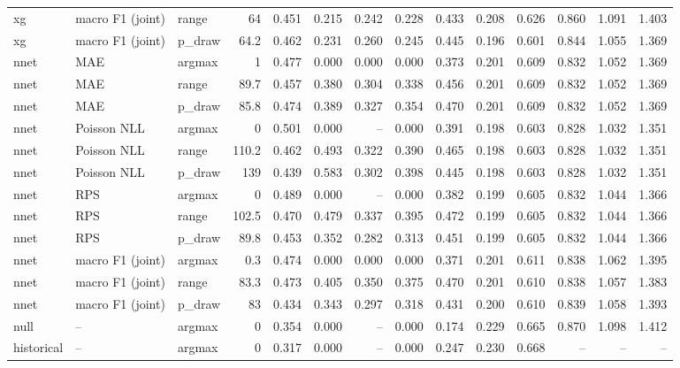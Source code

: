 \begin{tabular}{lllrrrrrrrrrrr}
xg & macro F1 (joint) & range & 64 & 0.451 & 0.215 & 0.242 & 0.228 & 0.433 & 0.208 & 0.626 & 0.860 & 1.091 & 1.403\\
xg & macro F1 (joint) & p\_draw & 64.2 & 0.462 & 0.231 & 0.260 & 0.245 & 0.445 & 0.196 & 0.601 & 0.844 & 1.055 & 1.369\\
nnet & MAE & argmax & 1 & 0.477 & 0.000 & 0.000 & 0.000 & 0.373 & 0.201 & 0.609 & 0.832 & 1.052 & 1.369\\
nnet & MAE & range & 89.7 & 0.457 & 0.380 & 0.304 & 0.338 & 0.456 & 0.201 & 0.609 & 0.832 & 1.052 & 1.369\\
nnet & MAE & p\_draw & 85.8 & 0.474 & 0.389 & 0.327 & 0.354 & 0.470 & 0.201 & 0.609 & 0.832 & 1.052 & 1.369\\
nnet & Poisson NLL & argmax & 0 & 0.501 & 0.000 & -- & 0.000 & 0.391 & 0.198 & 0.603 & 0.828 & 1.032 & 1.351\\
nnet & Poisson NLL & range & 110.2 & 0.462 & 0.493 & 0.322 & 0.390 & 0.465 & 0.198 & 0.603 & 0.828 & 1.032 & 1.351\\
nnet & Poisson NLL & p\_draw & 139 & 0.439 & 0.583 & 0.302 & 0.398 & 0.445 & 0.198 & 0.603 & 0.828 & 1.032 & 1.351\\
nnet & RPS & argmax & 0 & 0.489 & 0.000 & -- & 0.000 & 0.382 & 0.199 & 0.605 & 0.832 & 1.044 & 1.366\\
nnet & RPS & range & 102.5 & 0.470 & 0.479 & 0.337 & 0.395 & 0.472 & 0.199 & 0.605 & 0.832 & 1.044 & 1.366\\
nnet & RPS & p\_draw & 89.8 & 0.453 & 0.352 & 0.282 & 0.313 & 0.451 & 0.199 & 0.605 & 0.832 & 1.044 & 1.366\\
nnet & macro F1 (joint) & argmax & 0.3 & 0.474 & 0.000 & 0.000 & 0.000 & 0.371 & 0.201 & 0.611 & 0.838 & 1.062 & 1.395\\
nnet & macro F1 (joint) & range & 83.3 & 0.473 & 0.405 & 0.350 & 0.375 & 0.470 & 0.201 & 0.610 & 0.838 & 1.057 & 1.383\\
nnet & macro F1 (joint) & p\_draw & 83 & 0.434 & 0.343 & 0.297 & 0.318 & 0.431 & 0.200 & 0.610 & 0.839 & 1.058 & 1.393\\
null & -- & argmax & 0 & 0.354 & 0.000 & -- & 0.000 & 0.174 & 0.229 & 0.665 & 0.870 & 1.098 & 1.412\\
historical & -- & argmax & 0 & 0.317 & 0.000 & -- & 0.000 & 0.247 & 0.230 & 0.668 & -- & -- & --\\
\bottomrule
\end{tabular}
